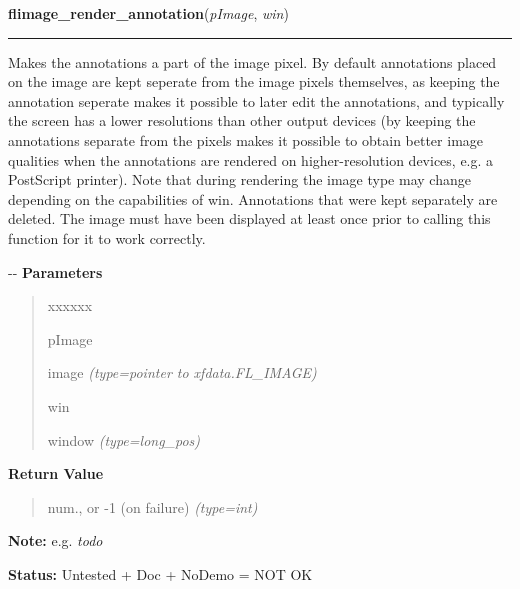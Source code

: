 \hspace{.8\funcindent}\begin{boxedminipage}{\funcwidth}

    \raggedright \textbf{flimage\_render\_annotation}(\textit{pImage}, \textit{win})

    \vspace{-1.5ex}

    \rule{\textwidth}{0.5\fboxrule}
\setlength{\parskip}{2ex}

Makes the annotations a part of the image pixel. By default annotations
placed on the image are kept seperate from the image pixels themselves, as
keeping the annotation seperate makes it possible to later edit the
annotations, and typically the screen has a lower resolutions than other
output devices (by keeping the annotations separate from the pixels makes
it possible to obtain better image qualities when the annotations are
rendered on higher-resolution devices, e.g. a PostScript printer). Note
that during rendering the image type may change depending on the
capabilities of win. Annotations that were kept separately are deleted.
The image must have been displayed at least once prior to calling this
function for it to work correctly.

-{}-
\setlength{\parskip}{1ex}
      \textbf{Parameters}
      \vspace{-1ex}

      \begin{quote}
        \begin{Ventry}{xxxxxx}

          \item[pImage]


image
            {\it (type=pointer to xfdata.FL\_IMAGE)}

          \item[win]


window
            {\it (type=long\_pos)}

        \end{Ventry}

      \end{quote}

      \textbf{Return Value}
    \vspace{-1ex}

      \begin{quote}

num., or -1 (on failure)
      {\it (type=int)}

      \end{quote}

\textbf{Note:} 
e.g. \emph{todo}


\textbf{Status:} 
Untested + Doc + NoDemo = NOT OK


    \end{boxedminipage}


